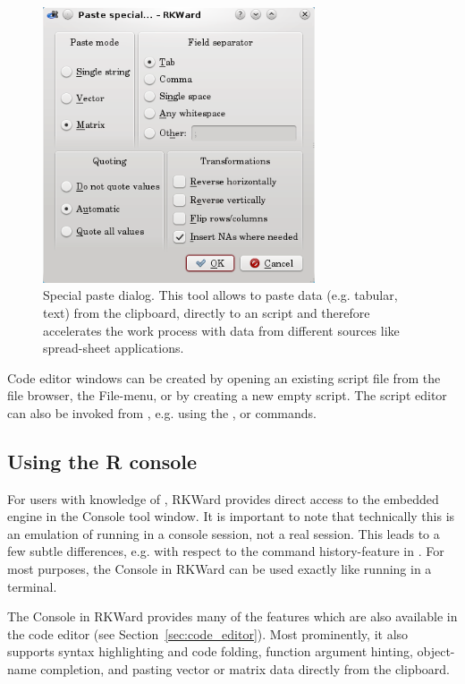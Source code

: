 \begin{figure}[htp]
 \centering
 \includegraphics[width=8.042cm,heigth=8.143cm]{../figures/special_paste.png}
 \caption{Special paste dialog. This tool allows to paste data (e.g. tabular, text) from the clipboard, directly to an 
  script and therefore accelerates the work process with data from different sources 
 like spread-sheet applications.
}
 \label{fig:special_paste}
\end{figure}

Code editor windows can be created by opening an existing
 script file from the file browser, the
File-menu, or by creating a new empty script. The script editor can
also be invoked from , e.g. using the
,  or 
commands.

\subsection{Using the R console}
\label{sec:using_R_console}
For users with knowledge of , RKWard provides direct access to the
embedded  engine in the
 Console tool window. It is important to note that technically this is an
emulation of  running in a console
session, not a real  session. This leads to a few subtle
differences, e.g. with respect to the command history-feature in
. For most purposes, the  Console in RKWard can be used exactly
like  running in a terminal.

The  Console in RKWard provides many of the
features which are also available in the code editor (see Section~\ref{sec:code_editor}).
Most prominently, it also supports syntax highlighting and code
folding, function argument hinting, object-name completion, and pasting
vector or matrix data directly from the clipboard.


